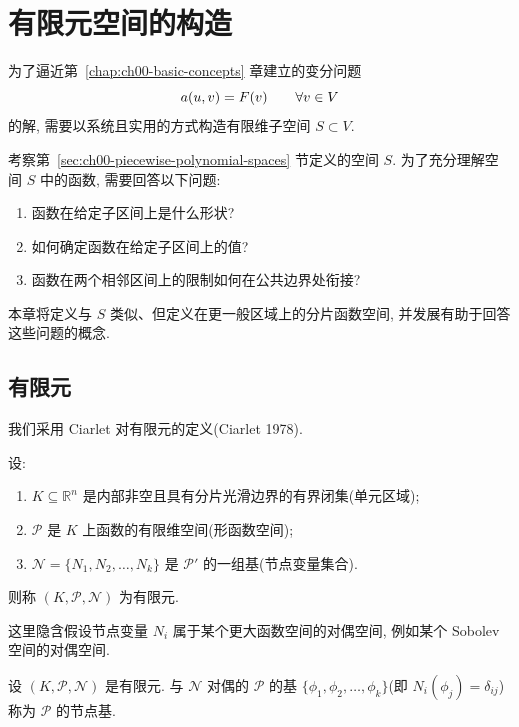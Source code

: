\clearpage
{}
\section{有限元空间的构造}
\label{chap:ch03-finite-element-space-construction}

为了逼近第~\ref{chap:ch00-basic-concepts} 章建立的变分问题
\[
\MathBookFormulaID{formula-ch03-variational-problem}
a(u,v)=F(v)\qquad\forall v\in V
\]
的解, 需要以系统且实用的方式构造有限维子空间 $S\subset V$.

考察第~\ref{sec:ch00-piecewise-polynomial-spaces} 节定义的空间 $S$. 为了充分理解空间 $S$ 中的函数, 需要回答以下问题:
\begin{enumerate}
\item 函数在给定子区间上是什么形状?
\item 如何确定函数在给定子区间上的值?
\item 函数在两个相邻区间上的限制如何在公共边界处衔接?
\end{enumerate}
本章将定义与 $S$ 类似、但定义在更一般区域上的分片函数空间, 并发展有助于回答这些问题的概念.

\subsection{有限元}
\label{sec:ch03-finite-element}
\setcounter{thmcount}{0}
\setcounter{equation}{0}

我们采用 Ciarlet 对有限元的定义(Ciarlet 1978).

\begin{Definition}
\label{def:ch03-finite-element}
设:
\begin{enumerate}
\item[(i)] $K\subseteq\mathbb R^n$ 是内部非空且具有分片光滑边界的有界闭集(单元区域);
\item[(ii)] $\mathcal P$ 是 $K$ 上函数的有限维空间(形函数空间);
\item[(iii)] $\mathcal N=\{N_1,N_2,\ldots,N_k\}$ 是 $\mathcal P'$ 的一组基(节点变量集合).
\end{enumerate}
则称 $(K,\mathcal P,\mathcal N)$ 为有限元.

这里隐含假设节点变量 $N_i$ 属于某个更大函数空间的对偶空间, 例如某个 Sobolev 空间的对偶空间.
\end{Definition}

\begin{Definition}
\label{def:ch03-nodal-basis}
设 $(K,\mathcal P,\mathcal N)$ 是有限元. 与 $\mathcal N$ 对偶的 $\mathcal P$ 的基 $\{\phi_1,\phi_2,\ldots,\phi_k\}$(即 $N_i(\phi_j)=\delta_{ij}$)称为 $\mathcal P$ 的节点基.
\end{Definition}

